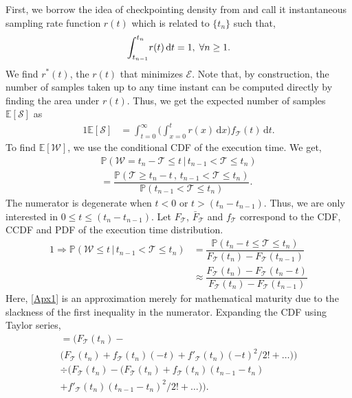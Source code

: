 First, we borrow the idea of checkpointing density from \textcite{CP_C,CP_C} and call it instantaneous sampling rate function $r(t)$ which is
related to $\{t_n\}$ such that,
\begin{alignat}{1}
{\int_{t_{n-1}}^{t_n}}r(t)\,\mathrm{d} t=1,\;\forall n\geq1.\label{rt}
\end{alignat}
We find $r^*(t)$, the $r(t)$ that minimizes $\mathcal{E}$.
Note that, by construction, the number of samples taken up to any time instant can be computed directly by finding the area under $r(t)$.
Thus, we get the expected number of samples $\mathbb{E}[\mathcal{S}]$ as
\begin{alignat}{1}
\mathbb{E}[\mathcal{S}]&=\int_{t=0}^{\infty}\bigg(\!\int_{x=0}^{t}\!\!\!\!r(x)\,\mathrm{d}x\bigg)f_{\mathcal{T}}(t)\,\mathrm{d}t.\label{Es}
\end{alignat}
To find 
$\mathbb{E}[\mathcal{W}]$, we use the conditional \ac{CDF} of the execution time.
We get,
\begin{multline*}
\mathbb{P}(\mathcal{W}=t_n-\mathcal{T}\leq t\,\big\vert\,t_{n-1}<\mathcal{T}\leq t_n)\\=\dfrac{\mathbb{P}(\mathcal{T}\geq t_n-t\,,\,t_{n-1}<\mathcal{T}\leq t_n)}{\mathbb{P}(t_{n-1}<\mathcal{T}\leq t_n)}.
\end{multline*}
The numerator is degenerate when $t\!<\!0$ or $t\!>\!(t_n\!-\!t_{n-1})$.
Thus, we are only interested in $0\!\leq\!t\!\leq\! (t_n-t_{n-1})$.
Let $F_{\mathcal{T}}$, $\bar{F}_{\mathcal{T}}$ and $f_{\mathcal{T}}$ correspond to the \ac{CDF}, \ac{CCDF} and \ac{PDF} of the execution time distribution.
\begin{alignat*}{1}
\!\!\!\Rightarrow\mathbb{P}(\mathcal{W}\leq t\,\big\vert\,t_{n-1}<\mathcal{T}\leq t_n)&=\dfrac{\mathbb{P}(t_n-t\leq\mathcal{T}\leq t_n)}{F_\mathcal{T}(t_n)-F_\mathcal{T}(t_{n-1})}\\
&\approx\dfrac{F_\mathcal{T}(t_n)-F_\mathcal{T}(t_{n}-t)}{F_\mathcal{T}(t_n)-F_\mathcal{T}(t_{n-1})}\tag{$A_1$}\label{Apx1}
\end{alignat*}
Here, \cref{Apx1} is an approximation merely for mathematical maturity due to the slackness of the first inequality in the numerator.
Expanding the \ac{CDF} using Taylor series, 
\begin{multline*}
    =\Big(F_\mathcal{T}(t_n)-\\\big(F_\mathcal{T}(t_n)+f_\mathcal{T}(t_n)(-t)+f'_\mathcal{T}(t_n)(-t)^2/2!+\dots\big)\Big)\\
    \div \Big(F_\mathcal{T}(t_n)-\big(F_\mathcal{T}(t_n)+f_\mathcal{T}(t_n)(t_{n-1}-t_n)\\+f'_\mathcal{T}(t_n)(t_{n-1}-t_n)^2/2!+\dots\big)\Big).
\end{multline*}
